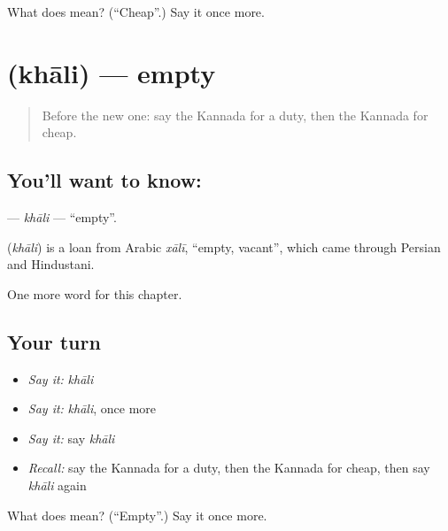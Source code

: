 \begin{tcolorbox}[breakable,colback=teal!4,colframe=teal!35!black,title={Before you move on}]
What does  mean? (\textquotedblleft{}Cheap\textquotedblright{}.) Say it once more.
\end{tcolorbox}
\section[\texorpdfstring{\kn{ಖಾಲಿ} (khāli)}{ಖಾಲಿ (khāli)}]{ (khāli) — empty}

\label{lesson:KA-C217-khali}



\begin{quote}
Before the new one: say the Kannada for a duty, then the Kannada for cheap.
\end{quote}

\subsection*{You'll want to know: }
\textbf{} — \emph{khāli} — \textquotedblleft{}empty\textquotedblright{}.

\begin{cousinweb}
\textbf{} (\emph{khāli}) is a loan from Arabic \emph{xālī}, \textquotedblleft{}empty, vacant\textquotedblright{}, which came through Persian and Hindustani.
\end{cousinweb}

\begin{grammarlens}[title={What you've built}]
One more word for this chapter.
\end{grammarlens}

\subsection*{Your turn}
\begin{itemize}
\raggedright
  \item \emph{Say it:} \emph{khāli}
  \item \emph{Say it:} \emph{khāli}, once more
  \item \emph{Say it:} say \emph{khāli}
  \item \emph{Recall:} say the Kannada for a duty, then the Kannada for cheap, then say \emph{khāli} again
\end{itemize}

\begin{tcolorbox}[breakable,colback=teal!4,colframe=teal!35!black,title={Before you move on}]
What does  mean? (\textquotedblleft{}Empty\textquotedblright{}.) Say it once more.
\end{tcolorbox}
